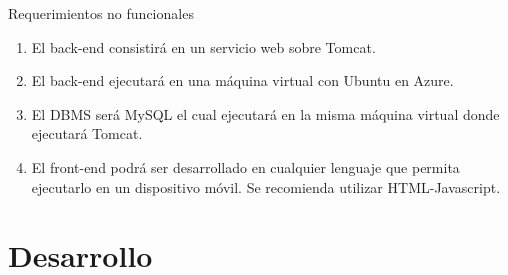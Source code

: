 \documentclass[11pt]{article}
\begin{document}
		Requerimientos no funcionales
\begin{enumerate}
			\item El back-end consistirá en un servicio web sobre Tomcat.
			\item El back-end ejecutará en una máquina virtual con Ubuntu en Azure.
			\item El DBMS será MySQL el cual ejecutará en la misma máquina virtual donde ejecutará Tomcat.
			\item El front-end podrá ser desarrollado en cualquier lenguaje que permita ejecutarlo en un dispositivo móvil. Se recomienda utilizar HTML-Javascript.
		\end{enumerate}
	\section{Desarrollo}
\end{document}
